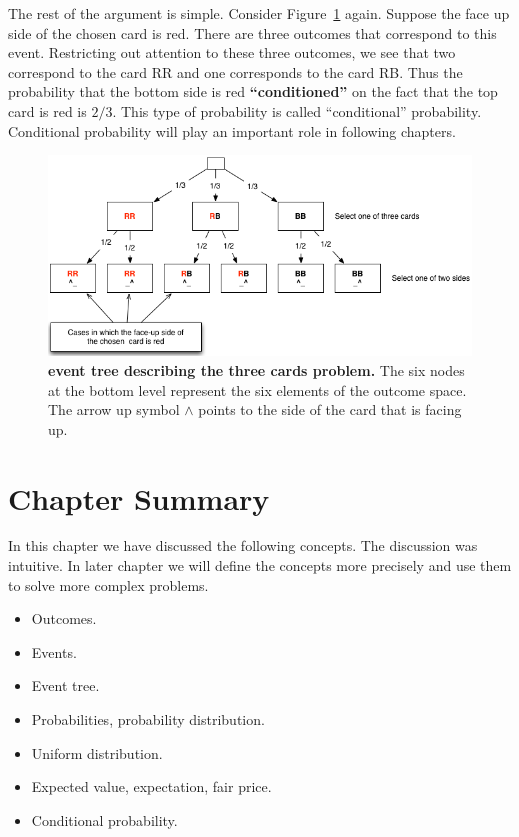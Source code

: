 The rest of the argument is simple. Consider Figure~\ref{fig:3cards}
again. Suppose the face up side of the chosen card is red. There are
three outcomes that correspond to this event. Restricting out
attention to these three outcomes, we see that two correspond to the
card RR and one corresponds to the card RB. Thus the probability that
the bottom side is red {\bf ``conditioned''} on the fact that the
top card is red is $2/3$. This type of probability is called
``conditional'' probability. Conditional probability will play an
important role in following chapters.

\begin{figure}[t]
\begin{center}
\includegraphics[width=4.5in]{figs/EventTree3Cards.png}
\end{center}
\caption{{\bf event tree describing the three cards problem.} The six
  nodes at the bottom level represent the six elements of the outcome
  space. The arrow up symbol $\wedge$ points to the side of the card
  that is facing up.\label{fig:3cards}}
\end{figure}

\section{Chapter Summary}
In this chapter we have discussed the following concepts. The
discussion was intuitive. In later chapter we will define the concepts
more precisely and use them to solve more complex problems.
\begin{itemize}
\item Outcomes.
\item Events.
\item Event tree.
\item Probabilities, probability distribution.
\item Uniform distribution.
\item Expected value, expectation, fair price. 
\item Conditional probability.
\end{itemize}

